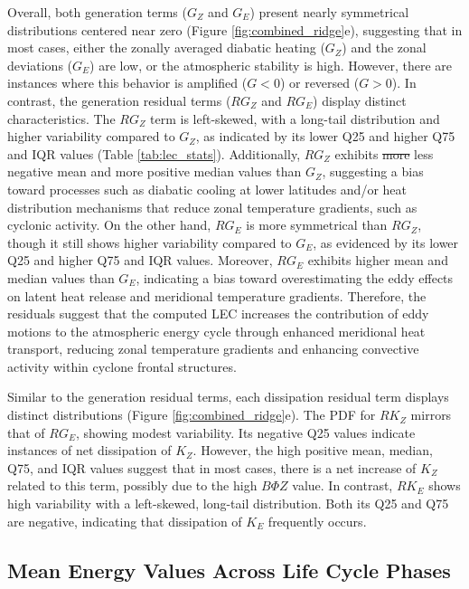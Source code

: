 \documentclass[pdflatex,sn-chicago]{sn-jnl}%
\makeatletter
\theoremstyle{plain}
\theoremstyle{definition}
\theoremstyle{remark}
\theoremstyle{definition}
\providecommand{\DIFaddtex}[1]{{\protect\color{blue}#1}} %
\providecommand{\DIFdeltex}[1]{{\protect\color{red}\sout{#1}}} %
\providecommand{\DIFaddbegin}{} %
\providecommand{\DIFaddend}{} %
\providecommand{\DIFdelbegin}{} %
\providecommand{\DIFdelend}{} %
\providecommand{\DIFadd}[1]{\texorpdfstring{\DIFaddtex{#1}}{#1}} %
\providecommand{\DIFdel}[1]{\texorpdfstring{\DIFdeltex{#1}}{}} %
\let\sout@orig\sout %
\renewcommand{\sout}[1]{\ifmmode\text{\sout@orig{\ensuremath{#1}}}\else\sout@orig{#1}\fi} %
\makeatother
\begin{document}
Overall, both generation terms ($G_Z$ and $G_E$) present nearly symmetrical distributions centered near zero (Figure \ref{fig:combined_ridge}e), suggesting that in most cases, either the zonally averaged diabatic heating ($G_Z$) and the zonal deviations ($G_E$) are low, or the atmospheric stability is high. However, there are instances where this behavior is amplified ($G < 0$) or reversed ($G > 0$). In contrast, the generation residual terms ($RG_Z$ and $RG_E$) display distinct characteristics. The $RG_Z$ term is left-skewed, with a long-tail distribution and higher variability compared to $G_Z$, as indicated by its lower Q25 and higher Q75 and IQR values (Table \ref{tab:lec_stats}). Additionally, $RG_Z$ exhibits \DIFdelbegin \DIFdel{more }\DIFdelend \DIFaddbegin \DIFadd{less }\DIFaddend negative mean and \DIFaddbegin \DIFadd{more positive }\DIFaddend median values than $G_Z$, suggesting a bias toward processes such as diabatic cooling at lower latitudes and/or heat distribution mechanisms that reduce zonal temperature gradients, such as cyclonic activity. On the other hand, $RG_E$ is more symmetrical than $RG_Z$, though it still shows higher variability compared to $G_E$, as evidenced by its lower Q25 and higher Q75 and IQR values. Moreover, $RG_E$ exhibits higher mean and median values than $G_E$, indicating a bias toward overestimating the eddy effects on latent heat release and meridional temperature gradients. Therefore, the residuals suggest that the computed LEC increases the contribution of eddy motions to the atmospheric energy cycle through enhanced meridional heat transport, reducing zonal temperature gradients and enhancing convective activity within cyclone frontal structures.

Similar to the generation residual terms, each dissipation residual term displays distinct distributions (Figure \ref{fig:combined_ridge}e). The PDF for $RK_Z$ mirrors that of $RG_E$, showing modest variability. Its negative Q25 values indicate instances of net dissipation of $K_Z$. However, the high positive mean, median, Q75, and IQR values suggest that in most cases, there is a net increase of $K_Z$ related to this term, possibly due to the high $B\Phi Z$ value. In contrast, $RK_E$ shows high variability with a left-skewed, long-tail distribution. Both its Q25 and Q75 are negative, indicating that dissipation of $K_E$ frequently occurs.

\subsection{Mean Energy Values Across Life Cycle Phases}\label{sec:mean}
\end{document}
